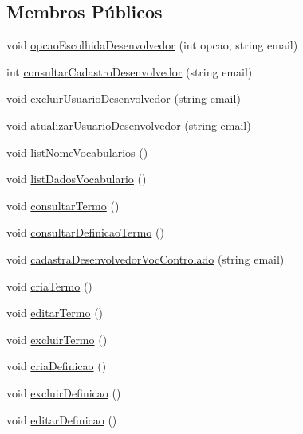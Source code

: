 \subsection*{Membros Públicos}
\begin{DoxyCompactItemize}
\item 
void \mbox{\hyperlink{class_servico_usuarios_desenvolvedor_a0214220e4cbac89da4ca22b10ac57c4e}{opcao\+Escolhida\+Desenvolvedor}} (int opcao, string email)
\item 
int \mbox{\hyperlink{class_servico_usuarios_desenvolvedor_a552cca1c14e7c9dd87600062d524ffa8}{consultar\+Cadastro\+Desenvolvedor}} (string email)
\item 
void \mbox{\hyperlink{class_servico_usuarios_desenvolvedor_ad536645995beed517216ed96206ae018}{excluir\+Usuario\+Desenvolvedor}} (string email)
\item 
void \mbox{\hyperlink{class_servico_usuarios_desenvolvedor_a2dc1811265f101d3ce14150594b25e88}{atualizar\+Usuario\+Desenvolvedor}} (string email)
\item 
void \mbox{\hyperlink{class_servico_usuarios_desenvolvedor_ad4f1b230cdb25ff8a2b8ae0010e99382}{list\+Nome\+Vocabularios}} ()
\item 
void \mbox{\hyperlink{class_servico_usuarios_desenvolvedor_a5748ea9d0e56ffcad31ad486ecb8b79f}{list\+Dados\+Vocabulario}} ()
\item 
void \mbox{\hyperlink{class_servico_usuarios_desenvolvedor_a9c4a519147798c77d3fb6406f8078b9f}{consultar\+Termo}} ()
\item 
void \mbox{\hyperlink{class_servico_usuarios_desenvolvedor_aa125405f5b747e4e7bbacebd28934e72}{consultar\+Definicao\+Termo}} ()
\item 
void \mbox{\hyperlink{class_servico_usuarios_desenvolvedor_a1708877c02739b2447862b2e2349267d}{cadastra\+Desenvolvedor\+Voc\+Controlado}} (string email)
\item 
void \mbox{\hyperlink{class_servico_usuarios_desenvolvedor_ab378812b1e6b4d648fb8860cf8444210}{cria\+Termo}} ()
\item 
void \mbox{\hyperlink{class_servico_usuarios_desenvolvedor_afb392520e6ea1209abb42ad0327673e0}{editar\+Termo}} ()
\item 
void \mbox{\hyperlink{class_servico_usuarios_desenvolvedor_a20712917886eaf28a2a9b308d14d7b04}{excluir\+Termo}} ()
\item 
void \mbox{\hyperlink{class_servico_usuarios_desenvolvedor_a851c2a4b054df2a14f66c451f4656d52}{cria\+Definicao}} ()
\item 
void \mbox{\hyperlink{class_servico_usuarios_desenvolvedor_a422f9a3ee77a0d560858c9f7c266b9ee}{excluir\+Definicao}} ()
\item 
void \mbox{\hyperlink{class_servico_usuarios_desenvolvedor_a2a1063014d21344c6ec9a101741e5a4e}{editar\+Definicao}} ()
\end{DoxyCompactItemize}


